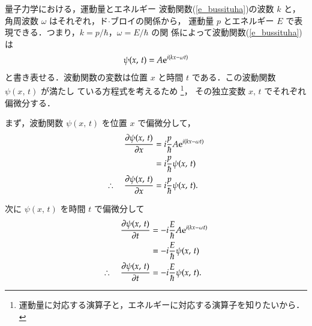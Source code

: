             \begin{mysmallsec}{量子力学における，運動量とエネルギー}
            波動関数(\ref{e_bussituha})の波数 $k$ と，角周波数 $\omega$ はそれぞれ，ド$\cdot$ブロイの関係から，
            運動量 $p$ とエネルギー $E$ で表現できる．つまり，$k=p/\hbar$，$\omega=E/\hbar$ の関
            係によって波動関数(\ref{e_bussituha})は
                \begin{align}\label{e_bussituha_2}
                    \psi(x,\,t) = A\e^{i\left( kx -  \omega t\right)}
                \end{align}
            と書き表せる．波動関数の変数は位置 $x$ と時間 $t$ である．この波動関数 $\psi(x,\,t)$ が満たし
            ている方程式を考えるため
                \footnote{
                    運動量に対応する演算子と，エネルギーに対応する演算子を知りたいから．
                }，
            その独立変数 $x,\,t$ でそれぞれ偏微分する．

            まず，波動関数 $\psi(x,\,t)$ を位置 $x$ で偏微分して，
                \begin{align}\label{hadoukansu_p}
                    \frac{\rd \psi(x,\,t)}{\rd x}
                        &= i\frac{p}{\hbar}A\e^{i\left( kx -  \omega t\right)} \notag \\
                        &=i\frac{p}{\hbar}\psi(x,\,t) \notag \\
                    \therefore \quad
                    \frac{\rd \psi(x,\,t)}{\rd x}
                        &= i\frac{p}{\hbar}\psi(x,\,t).
                \end{align}

            次に $\psi(x,\,t)$ を時間 $t$ で偏微分して
                \begin{align}\label{hadoukansu_e}
                    \frac{\rd \psi(x,\,t)}{\rd t}
                        &= -i\frac{E}{\hbar}A\e^{i\left( kx -  \omega t\right)} \notag \\
                        &=-i\frac{E}{\hbar}\psi(x,\,t) \notag \\
                    \therefore \quad
                    \frac{\rd \psi(x,\,t)}{\rd t}
                        &= -i\frac{E}{\hbar}\psi(x,\,t).
                \end{align}


\end{mysmallsec}
